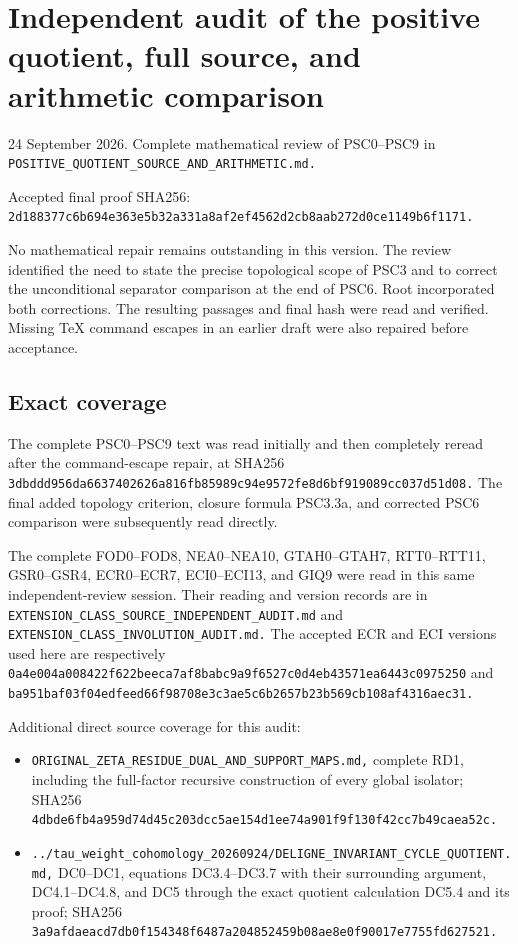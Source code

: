 \section{Independent audit of the positive quotient, full source, and
arithmetic
comparison}\label{independent-audit-of-the-positive-quotient-full-source-and-arithmetic-comparison}

24 September 2026. Complete mathematical review of PSC0--PSC9 in
\nolinkurl{POSITIVE_QUOTIENT_SOURCE_AND_ARITHMETIC.md.}

Accepted final proof SHA256:
\nolinkurl{2d188377c6b694e363e5b32a331a8af2ef4562d2cb8aab272d0ce1149b6f1171.}

No mathematical repair remains outstanding in this version. The review
identified the need to state the precise topological scope of PSC3 and
to correct the unconditional separator comparison at the end of PSC6.
Root incorporated both corrections. The resulting passages and final
hash were read and verified. Missing TeX command escapes in an earlier
draft were also repaired before acceptance.

\subsection{Exact coverage}\label{exact-coverage}

The complete PSC0--PSC9 text was read initially and then completely
reread after the command-escape repair, at SHA256
\nolinkurl{3dbddd956da6637402626a816fb85989c94e9572fe8d6bf919089cc037d51d08.}
The final added topology criterion, closure formula PSC3.3a, and
corrected PSC6 comparison were subsequently read directly.

The complete FOD0--FOD8, NEA0--NEA10, GTAH0--GTAH7, RTT0--RTT11,
GSR0--GSR4, ECR0--ECR7, ECI0--ECI13, and GIQ9 were read in this same
independent-review session. Their reading and version records are in
\nolinkurl{EXTENSION_CLASS_SOURCE_INDEPENDENT_AUDIT.md} and
\nolinkurl{EXTENSION_CLASS_INVOLUTION_AUDIT.md.} The accepted ECR and
ECI versions used here are respectively
\nolinkurl{0a4e004a008422f622beeca7af8babc9a9f6527c0d4eb43571ea6443c0975250}
and
\nolinkurl{ba951baf03f04edfeed66f98708e3c3ae5c6b2657b23b569cb108af4316aec31.}

Additional direct source coverage for this audit:

\begin{itemize}
\tightlist
\item
  \nolinkurl{ORIGINAL_ZETA_RESIDUE_DUAL_AND_SUPPORT_MAPS.md,} complete
  RD1, including the full-factor recursive construction of every global
  isolator; SHA256
  \nolinkurl{4dbde6fb4a959d74d45c203dcc5ae154d1ee74a901f9f130f42cc7b49caea52c.}
\item
  \nolinkurl{../tau_weight_cohomology_20260924/DELIGNE_INVARIANT_CYCLE_QUOTIENT.md,}
  DC0--DC1, equations DC3.4--DC3.7 with their surrounding argument,
  DC4.1--DC4.8, and DC5 through the exact quotient calculation DC5.4 and
  its proof; SHA256
  \nolinkurl{3a9afdaeacd7db0f154348f6487a204852459b08ae8e0f90017e7755fd627521.}
\end{itemize}

